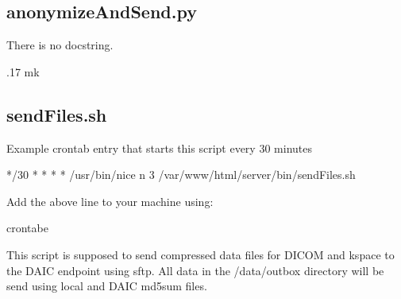 \documentclass[letterpaper,10pt,english]{sphinxmanual}
\begin{document}
\sphinxAtStartPar
{}

\sphinxAtStartPar
{}

\sphinxAtStartPar
{}

\sphinxAtStartPar
{}

\sphinxAtStartPar
{}

\sphinxstepscope


\subsection{anonymizeAndSend.py}
\label{\detokenize{Architecture/scripts/anonymizeAndSend:anonymizeandsend-py}}\label{\detokenize{Architecture/scripts/anonymizeAndSend::doc}}
\sphinxAtStartPar
There is no docstring.

.17 mk

\sphinxstepscope


\subsection{sendFiles.sh}
\label{\detokenize{Architecture/scripts/sendFiles:sendfiles-sh}}\label{\detokenize{Architecture/scripts/sendFiles::doc}}
\sphinxAtStartPar
Example crontab entry that starts this script every 30 minutes

\begin{sphinxVerbatim}[commandchars=\\\{\}]
*/30 * * * * /usr/bin/nice \PYGZhy{}n 3 /var/www/html/server/bin/sendFiles.sh
\end{sphinxVerbatim}

\sphinxAtStartPar
Add the above line to your machine using:

\begin{sphinxVerbatim}[commandchars=\\\{\}]
\PYGZgt{}crontab\PYGZhy{}e
\end{sphinxVerbatim}

\sphinxAtStartPar
This script is supposed to send compressed data files for DICOM and k\sphinxhyphen{}space to the DAIC endpoint using sftp. All data in the /data/outbox directory will be send using local and DAIC md5sum files.
\end{document}
